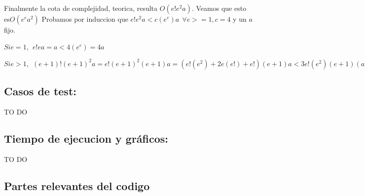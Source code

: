 \documentclass[10pt, a4paper]{article}
\begin{document}
Finalmente la cota de complejidad, teorica, resulta $O(e!e^{2}a)$. Veamos que esto es$ O(e^{e}a^{2})$
Probamos por induccion que $e!e^{2}a < c(e^e)a \ \ \forall e >=1 , c = 4 $ y un $a$ fijo.

$Si e = 1,\ \  e!ea = a < 4(e^{e})=4a$

$Si e > 1, \ \  (e+1)!(e+1)^{2}a = e!(e+1)^{2}(e+1)a = (e!(e^{2}) + 2e(e!) + e!)(e+1)a < 3e!(e^{2})(e+1)(a)<\ (por hi) \ 3e^{e}(e+1)(a) = (3e^{(e+1)} + 3*e^{e})a < 4(e+1)^{(e+1)}a.$


\subsection{Casos de test:}
TO DO

\subsection{Tiempo de ejecucion y gráficos:}
TO DO

\subsection{Partes relevantes del codigo}
\end{document}
